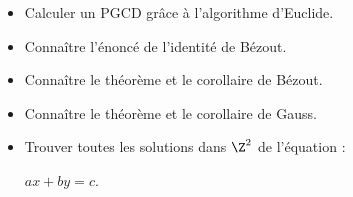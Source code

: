 \begin{acquis}
\begin{itemize}
\item Calculer un PGCD grâce à l'algorithme d'Euclide.

\item Connaître l'énoncé de l'identité de Bézout.

\item Connaître le théorème et le corollaire de Bézout.

\end{itemize}
\begin{itemize}
\item Connaître le théorème et le corollaire de Gauss.
\item Trouver toutes les solutions dans $\Z^2$ de l'équation :

$ax+by=c$.
\end{itemize}
\end{acquis}


